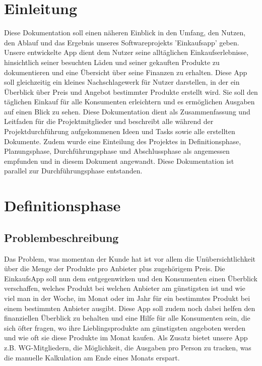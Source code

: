 \documentclass[12pt,a4paper]{article}
\begin{document}
\section*{Einleitung}
Diese Dokumentation soll einen näheren Einblick in den Umfang, 
den Nutzen, den Ablauf und das Ergebnis unseres Softwareprojekts 'Einkaufsapp' geben.  
\newline
Unsere entwickelte App dient dem Nutzer seine alltäglichen Einkaufserlebnisse, hinsichtlich seiner besuchten Läden und seiner gekauften Produkte zu dokumentieren und eine Übersicht über seine Finanzen zu erhalten.
Diese App soll gleichzeitig ein kleines Nachschlagewerk für Nutzer darstellen, in der ein Überblick über Preis und Angebot bestimmter Produkte erstellt wird. 
Sie soll den täglichen Einkauf für alle Konsumenten erleichtern und es ermöglichen Ausgaben auf einen Blick zu sehen.
\newline
Diese Dokumentation dient als Zusammenfassung und Leitfaden für die Projektmitglieder und beschreibt alle während der Projektdurchführung aufgekommenen Ideen und Tasks sowie alle  erstellten Dokumente.
\newline
Zudem wurde eine Einteilung des Projektes in Definitionsphase, Planungsphase, Durchführungsphase und Abschlussphase als angemessen empfunden und in diesem Dokument angewandt.
Diese Dokumentation ist parallel zur Durchführungsphase entstanden.
\newline
\newpage
\section{Definitionsphase}
\subsection{Problembeschreibung}
Das Problem, was momentan der Kunde hat ist vor allem die Unübersichtlichkeit über die Menge der Produkte pro Anbieter plus zugehörigem Preis. 
Die EinkaufsApp soll nun dem entgegenwirken und den Konsumenten einen Überblick verschaffen, welches Produkt bei welchen Anbieter am günstigsten ist und wie viel man in der Woche, im Monat oder im Jahr für ein bestimmtes Produkt bei einem bestimmten Anbieter ausgibt. 
Diese App soll zudem noch dabei helfen den finanziellen Überblick zu behalten und eine Hilfe für alle Konsumenten sein, die sich öfter fragen, wo ihre Lieblingsprodukte am günstigsten angeboten werden und wie oft sie diese Produkte im Monat kaufen.
Als Zusatz bietet unsere App z.B. WG-Mitgliedern, die Möglichkeit, die Ausgaben pro Person zu tracken, was die manuelle Kalkulation am Ende eines Monats erspart. 
\end{document}
